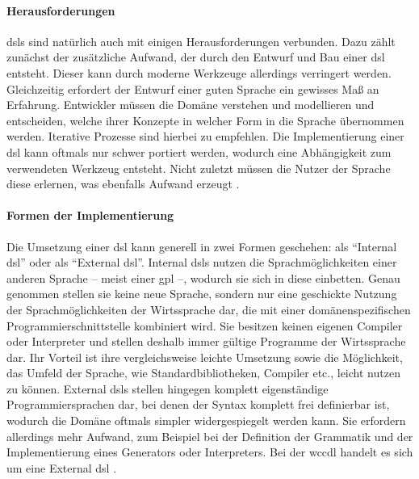     \paragraph{Herausforderungen}
    \glspl{dsl} sind natürlich auch mit einigen Herausforderungen verbunden.
    Dazu zählt zunächst der zusätzliche Aufwand, der durch den Entwurf und Bau einer \gls{dsl} entsteht.
    Dieser kann durch moderne Werkzeuge allerdings verringert werden.
    Gleichzeitig erfordert der Entwurf einer guten Sprache ein gewisses Maß an Erfahrung.
    Entwickler müssen die Domäne verstehen und modellieren und entscheiden,
    welche ihrer Konzepte in welcher Form in die Sprache übernommen werden.
    Iterative Prozesse sind hierbei zu empfehlen.
    Die Implementierung einer \gls{dsl} kann oftmals nur schwer portiert werden,
    wodurch eine Abhängigkeit zum verwendeten Werkzeug entsteht.
    Nicht zuletzt müssen die Nutzer der Sprache diese erlernen,
    was ebenfalls Aufwand erzeugt
    \cite[Kapitel 2.6]{voelter:DslEngineering}.

    \paragraph{Formen der Implementierung}
    Die Umsetzung einer \gls{dsl} kann generell in zwei Formen geschehen:
    als "`Internal \gls{dsl}"' oder als "`External \gls{dsl}"'.
    Internal \glspl{dsl} nutzen die Sprachmöglichkeiten einer anderen Sprache
    -- meist einer \gls{gpl} --, wodurch sie sich in diese einbetten.
    Genau genommen stellen sie keine neue Sprache,
    sondern nur eine geschickte Nutzung der Sprachmöglichkeiten
    der Wirtssprache dar, die mit einer domänenspezifischen Programmierschnittstelle kombiniert wird.
    Sie besitzen keinen eigenen Compiler oder Interpreter und stellen deshalb immer gültige Programme
    der Wirtssprache dar.
    Ihr Vorteil ist ihre vergleichsweise leichte Umsetzung sowie die Möglichkeit, das Umfeld der Sprache,
    wie Standardbibliotheken, Compiler etc., leicht nutzen zu können.
    External \glspl{dsl} stellen hingegen komplett eigenständige Programmiersprachen dar,
    bei denen der Syntax komplett frei definierbar ist,
    wodurch die Domäne oftmals simpler widergespiegelt werden kann.
    Sie erfordern allerdings mehr Aufwand, zum Beispiel bei der Definition der Grammatik
    und der Implementierung eines Generators oder Interpreters.
    Bei der \gls{wccdl} handelt es sich um eine External \gls{dsl}
    \cite[Kapitel 2.8.1]{voelter:DslEngineering}.

